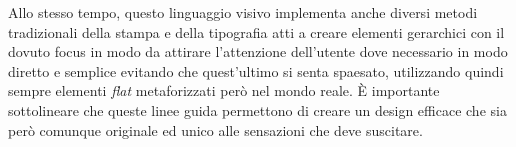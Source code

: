 Allo stesso tempo, questo linguaggio visivo implementa anche diversi metodi tradizionali della stampa e della tipografia atti a creare elementi gerarchici con il dovuto focus in modo da attirare l'attenzione dell'utente dove necessario in modo diretto e semplice evitando che quest'ultimo si senta spaesato, utilizzando quindi sempre elementi \textit{flat} metaforizzati però nel mondo reale. È importante sottolineare che queste linee guida permettono di creare un design efficace che sia però comunque originale ed unico alle sensazioni che deve suscitare.